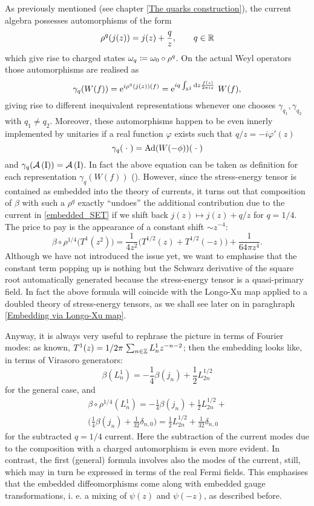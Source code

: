 As previously mentioned (see chapter  
\ref{The quarks construction}), 
the current algebra possesses
automorphisms of the form 
\[
\rho^q(j(z))=j(z)+\frac{q}{z},\qquad q\in\mathbb{R}
\]
which give rise to charged states $\omega_q
\coloneqq\omega_0\circ\rho^q$. On the actual Weyl 
operators those automorphisms are realised as
\[
\gamma_q(W(f))=\operatorname{e}^{i\rho^q(j(z))(f)}=
\operatorname{e}^{iq\int_{\textrm{S}^1}\textrm{d} z \frac{f(z)}{2\pi i z}}\,W(f),
\]
giving rise to different inequivalent representations
whenever one chooses $\gamma_{q_1},\gamma_{q_2}$ with 
$q_1\neq q_2$. Moreover, these automorphisms happen to be
even innerly implemented by unitaries if a real function 
$\varphi$ exists such that $q/z=-i\varphi'(z)$
\[
\gamma_{q}(\;{\cdot}\;)=\operatorname{Ad}(W(-\phi))(\;{\cdot}\;)
\]
and $\gamma_q(\mathcal{A}\left(\textrm{I}\right))=\mathcal{A}\left(\textrm{I}\right)$. In fact the above equation
can be taken as definition for each representation
$\gamma_q(W(f))$ (\cite{Ca2004}). However, since the  
stress-energy tensor is contained as embedded into
the theory of currents, it turns out that 
composition of $\beta$ with such a $\rho^q$
exactly ``undoes''  the additional contribution
due to the current in \eqref{embedded_SET} if
we shift back $j(z)\mapsto j(z)+q/z$ for 
$q=1/4$. The price to pay is the appearance
of a constant shift $\sim z^{-4}$:
\[
\beta\circ\rho^{1/4}\big(T^1(z^2)\big)=
\frac{1}{4z^2}\big(T^{1/2}(z)+T^{1/2}(-z)\big)+
\frac{1}{64\pi z^4}.
\]
Although we have not introduced the issue yet, we want
to emphasise that the constant term popping up 
is nothing but the Schwarz derivative of the square root 
automatically generated because the stress-energy tensor is a 
quasi-primary field. In fact the above formula will
coincide with the Longo-Xu map applied to a doubled 
theory of stress-energy tensors, as we shall see later on
in paraghraph \ref{Embedding via Longo-Xu map}.

Anyway, it is always very useful to rephrase the 
picture in terms of Fourier modes: as known, 
$T^1(z)=1/2\pi\,\sum_{n\in\mathbb{Z}}L^1_n z^{-n-2}$; then 
the embedding looks like, in terms of Virasoro
generators:
\[
\beta(L_n^1)=-\frac{1}{4}\beta(j_n)+
\frac{1}{2}L_{2n}^{1/2}
\]
for the general case, and 
\begin{multline*}
\beta\circ\rho^{1/4}(L_n^1)=-\frac{1}{4}\beta(j_n)+
\frac{1}{2}L_{2n}^{1/2} +\\ \Big(\frac{1}{4}\beta(j_n)+
\frac{1}{32}\delta_{n,0}\Big)=
\frac{1}{2}L_{2n}^{1/2}+
\frac{1}{32}\delta_{n,0}
\end{multline*}
for the subtracted $q=1/4$ current. Here 
the subtraction of the current modes due to the composition
with a charged automorphism is even more evident. 
In contrast, the first (general)
formula involves also the modes of the current, still, which 
may in turn be expressed in terms of the real Fermi fields.
This emphasises that the embedded diffeomorphisms come
along with embedded gauge transformations, i. e. a mixing
of $\psi(z)$ and $\psi(-z)$, as described before.

